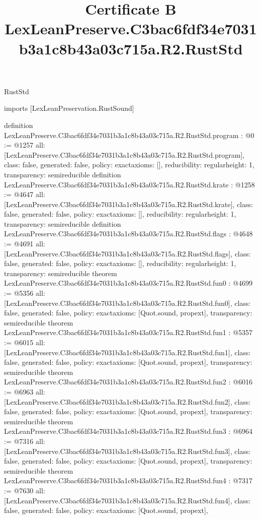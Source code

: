\begin{lexlean}{RustStd}
\title{Certificate B LexLeanPreserve.C3bac6fdf34e7031b3a1c8b43a03c715a.R2.RustStd}
\begin{coremodule}
imports [LexLeanPreservation.RustSound]

definition LexLeanPreserve.C3bac6fdf34e7031b3a1c8b43a03c715a.R2.RustStd.program : @0 := @1257 {
  all: [LexLeanPreserve.C3bac6fdf34e7031b3a1c8b43a03c715a.R2.RustStd.program],
  class: false,
  generated: false,
  policy: exact{axioms: []},
  reducibility: regular{height: 1},
  transparency: semireducible
}
definition LexLeanPreserve.C3bac6fdf34e7031b3a1c8b43a03c715a.R2.RustStd.krate : @1258 := @4647 {
  all: [LexLeanPreserve.C3bac6fdf34e7031b3a1c8b43a03c715a.R2.RustStd.krate],
  class: false,
  generated: false,
  policy: exact{axioms: []},
  reducibility: regular{height: 1},
  transparency: semireducible
}
definition LexLeanPreserve.C3bac6fdf34e7031b3a1c8b43a03c715a.R2.RustStd.flags : @4648 := @4691 {
  all: [LexLeanPreserve.C3bac6fdf34e7031b3a1c8b43a03c715a.R2.RustStd.flags],
  class: false,
  generated: false,
  policy: exact{axioms: []},
  reducibility: regular{height: 1},
  transparency: semireducible
}
theorem LexLeanPreserve.C3bac6fdf34e7031b3a1c8b43a03c715a.R2.RustStd.fun0 : @4699 := @5356 {
  all: [LexLeanPreserve.C3bac6fdf34e7031b3a1c8b43a03c715a.R2.RustStd.fun0],
  class: false,
  generated: false,
  policy: exact{axioms: [Quot.sound, propext]},
  transparency: semireducible
}
theorem LexLeanPreserve.C3bac6fdf34e7031b3a1c8b43a03c715a.R2.RustStd.fun1 : @5357 := @6015 {
  all: [LexLeanPreserve.C3bac6fdf34e7031b3a1c8b43a03c715a.R2.RustStd.fun1],
  class: false,
  generated: false,
  policy: exact{axioms: [Quot.sound, propext]},
  transparency: semireducible
}
theorem LexLeanPreserve.C3bac6fdf34e7031b3a1c8b43a03c715a.R2.RustStd.fun2 : @6016 := @6963 {
  all: [LexLeanPreserve.C3bac6fdf34e7031b3a1c8b43a03c715a.R2.RustStd.fun2],
  class: false,
  generated: false,
  policy: exact{axioms: [Quot.sound, propext]},
  transparency: semireducible
}
theorem LexLeanPreserve.C3bac6fdf34e7031b3a1c8b43a03c715a.R2.RustStd.fun3 : @6964 := @7316 {
  all: [LexLeanPreserve.C3bac6fdf34e7031b3a1c8b43a03c715a.R2.RustStd.fun3],
  class: false,
  generated: false,
  policy: exact{axioms: [Quot.sound, propext]},
  transparency: semireducible
}
theorem LexLeanPreserve.C3bac6fdf34e7031b3a1c8b43a03c715a.R2.RustStd.fun4 : @7317 := @7630 {
  all: [LexLeanPreserve.C3bac6fdf34e7031b3a1c8b43a03c715a.R2.RustStd.fun4],
  class: false,
  generated: false,
  policy: exact{axioms: [Quot.sound, propext]},
}
\end{coremodule}
\end{lexlean}
